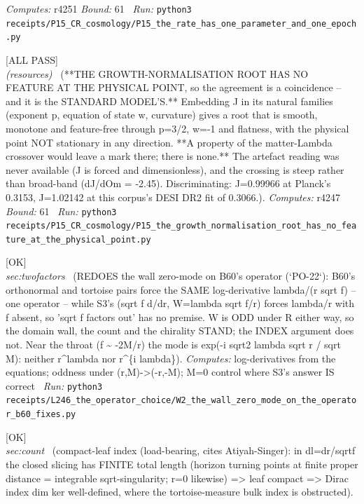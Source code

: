 \begin{description}
\emph{Computes:} r4251
 \emph{Bound:} 61
\ \emph{Run:} \texttt{python3 receipts/P15\_CR\_cosmology/P15\_the\_rate\_has\_one\_parameter\_and\_one\_epoch.py}
\item[\label{rcpt:P15_the_growth_normalisation_root_has_no_feature_at_the_physical_point}\texttt{P15\_the\_growth\_normalisation\_root\_has\_no\_feature\_at\_the\_physical\_point}]\hfill\textsf{[ALL PASS]}\\
\textit{(resources)} \ (**THE GROWTH-NORMALISATION ROOT HAS NO FEATURE AT THE PHYSICAL POINT, so the agreement is a coincidence -- and it is the STANDARD MODEL'S.** Embedding J in its natural families (exponent p, equation of state w, curvature) gives a root that is smooth, monotone and feature-free through p=3/2, w=-1 and flatness, with the physical point NOT stationary in any direction. **A property of the matter-Lambda crossover would leave a mark there; there is none.** The artefact reading was never available (J is forced and dimensionless), and the crossing is steep rather than broad-band (dJ/dOm = -2.45). Discriminating: J=0.99966 at Planck's 0.3153, J=1.02142 at this corpus's DESI DR2 fit of 0.3066.). 
\emph{Computes:} r4247
 \emph{Bound:} 61
\ \emph{Run:} \texttt{python3 receipts/P15\_CR\_cosmology/P15\_the\_growth\_normalisation\_root\_has\_no\_feature\_at\_the\_physical\_point.py}
\item[\label{rcpt:W2_the_wall_zero_mode_on_the_operator_b60_fixes}\texttt{W2\_the\_wall\_zero\_mode\_on\_the\_operator\_b60\_fixes}]\hfill\textsf{[OK]}\\
\textit{sec:twofactors} \ (REDOES the wall zero-mode on B60's operator (`PO-22`): B60's orthonormal and tortoise pairs force the SAME log-derivative lambda/(r sqrt f) -- one operator -- while S3's (sqrt f d/dr, W=lambda sqrt f/r) forces lambda/r with f absent, so 'sqrt f factors out' has no premise. W is ODD under R either way, so the domain wall, the count and the chirality STAND; the INDEX argument does not. Near the throat (f \textasciitilde{} -2M/r) the mode is exp(-i sqrt2 lambda sqrt r / sqrt M): neither r\textasciicircum{}lambda nor r\textasciicircum{}\{i lambda\}). 
\emph{Computes:} log-derivatives from the equations; oddness under (r,M)->(-r,-M); M=0 control where S3's answer IS correct
\ \emph{Run:} \texttt{python3 receipts/L246\_the\_operator\_choice/W2\_the\_wall\_zero\_mode\_on\_the\_operator\_b60\_fixes.py}
\item[\label{rcpt:P14_leaf_compactness}\texttt{P14\_leaf\_compactness}]\hfill\textsf{[OK]}\\
\textit{sec:count} \ (compact-leaf index (load-bearing, cites Atiyah-Singer): in dl=dr/sqrt\textbar{}f\textbar{} the closed slicing has FINITE total length (horizon turning points at finite proper distance = integrable sqrt-singularity; r=0 likewise) => leaf compact => Dirac index dim ker well-defined, where the tortoise-measure bulk index is obstructed). 

\end{description}
